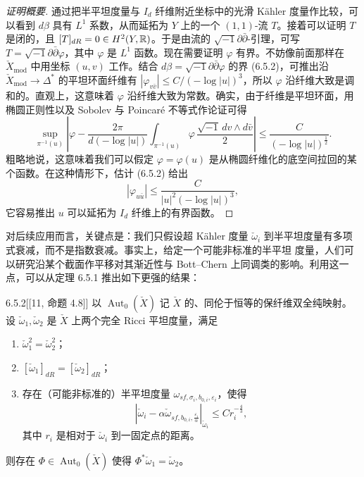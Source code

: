 \begin{proof}[证明概要]
通过把半平坦度量与 $I_d$ 纤维附近坐标中的光滑 Kähler 度量作比较，可以看到 $d\beta$ 具有 $L^1$ 系数，从而延拓为 $Y$ 上的一个 $(1,1)$-流 $T$。接着可以证明 $T$ 是闭的，且 $[T]_{dR}=0\in H^2(Y,\mathbb{R})$。于是由流的 $\sqrt{-1}\partial\bar\partial$-引理，可写 $T=\sqrt{-1}\partial\bar\partial\varphi$，其中 $\varphi$ 是 $L^1$ 函数。现在需要证明 $\varphi$ 有界。不妨像前面那样在 $\check X_{\mathrm{mod}}$ 中用坐标 $(u,v)$ 工作。结合 $d\beta=\sqrt{-1}\partial\bar\partial\varphi$ 的界 (6.5.2)，可推出沿 $\check X_{\mathrm{mod}}\to\Delta^*$ 的平坦环面纤维有 $|\varphi_{v\bar v}|\le C/(-\log|u|)^3$，所以 $\varphi$ 沿纤维大致是调和的。直观上，这意味着 $\varphi$ 沿纤维大致为常数。确实，由于纤维是平坦环面，用椭圆正则性以及 Sobolev 与 Poincaré 不等式作论证可得
\[
\sup_{\pi^{-1}(u)}\left|\varphi-\frac{2\pi}{d(-\log|u|)}\int_{\pi^{-1}(u)}\varphi\,\frac{\sqrt{-1}\,dv\wedge d\bar v}{2}\right|\le\frac{C}{(-\log|u|)^{\frac12}}.
\]
粗略地说，这意味着我们可以假定 $\varphi=\varphi(u)$ 是从椭圆纤维化的底空间拉回的某个函数。在这种情形下，估计 (6.5.2) 给出
\[
|\varphi_{u\bar u}|\le\frac{C}{|u|^2(-\log|u|)^3},
\]
它容易推出 $u$ 可以延拓为 $I_d$ 纤维上的有界函数。\proofend
\end{proof}

对后续应用而言，关键点是：我们只假设超 Kähler 度量 $\check\omega_i$ 到半平坦度量有多项式衰减，而不是指数衰减。事实上，给定一个可能非标准的半平坦
度量，人们可以研究沿某个截面作平移对其渐近性与 Bott--Chern 上同调类的影响。利用这一点，可以从定理 6.5.1 推出如下更强的结果：

\begin{theorem}{6.5.2}[{[11, 命题 4.8]}]
以 $\operatorname{Aut}_0(\check X)$ 记 $\check X$ 的、同伦于恒等的保纤维双全纯映射。设 $\check\omega_1,\check\omega_2$ 是 $\check X$ 上两个完全 Ricci 平坦度量，满足
\begin{enumerate}
\item $\check\omega_1^2=\check\omega_2^2$；
\item $[\check\omega_1]_{dR}=[\check\omega_2]_{dR}$；
\item 存在（可能非标准的）半平坦度量 $\omega_{sf,\sigma_i,b_{0,i},\varepsilon_i}$，使得
\[
|\check\omega_i-\alpha\check\omega_{sf,b_{0,i},\frac{\varepsilon_i}{\alpha}}|_{\check\omega_i}\le Cr_i^{-\frac43},
\]
其中 $r_i$ 是相对于 $\check\omega_i$ 到一固定点的距离。
\end{enumerate}
则存在 $\Phi\in\operatorname{Aut}_0(\check X)$ 使得 $\Phi^*\check\omega_1=\check\omega_2$。
\end{theorem}


